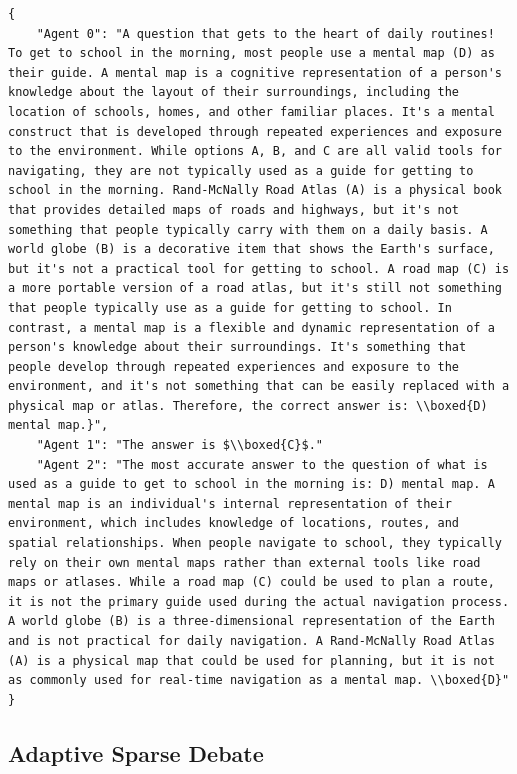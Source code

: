 \begin{lstlisting}[]
{
    "Agent 0": "A question that gets to the heart of daily routines! To get to school in the morning, most people use a mental map (D) as their guide. A mental map is a cognitive representation of a person's knowledge about the layout of their surroundings, including the location of schools, homes, and other familiar places. It's a mental construct that is developed through repeated experiences and exposure to the environment. While options A, B, and C are all valid tools for navigating, they are not typically used as a guide for getting to school in the morning. Rand-McNally Road Atlas (A) is a physical book that provides detailed maps of roads and highways, but it's not something that people typically carry with them on a daily basis. A world globe (B) is a decorative item that shows the Earth's surface, but it's not a practical tool for getting to school. A road map (C) is a more portable version of a road atlas, but it's still not something that people typically use as a guide for getting to school. In contrast, a mental map is a flexible and dynamic representation of a person's knowledge about their surroundings. It's something that people develop through repeated experiences and exposure to the environment, and it's not something that can be easily replaced with a physical map or atlas. Therefore, the correct answer is: \\boxed{D) mental map.}",
    "Agent 1": "The answer is $\\boxed{C}$."
    "Agent 2": "The most accurate answer to the question of what is used as a guide to get to school in the morning is: D) mental map. A mental map is an individual's internal representation of their environment, which includes knowledge of locations, routes, and spatial relationships. When people navigate to school, they typically rely on their own mental maps rather than external tools like road maps or atlases. While a road map (C) could be used to plan a route, it is not the primary guide used during the actual navigation process. A world globe (B) is a three-dimensional representation of the Earth and is not practical for daily navigation. A Rand-McNally Road Atlas (A) is a physical map that could be used for planning, but it is not as commonly used for real-time navigation as a mental map. \\boxed{D}"
}
\end{lstlisting}

\subsection{Adaptive Sparse Debate}

